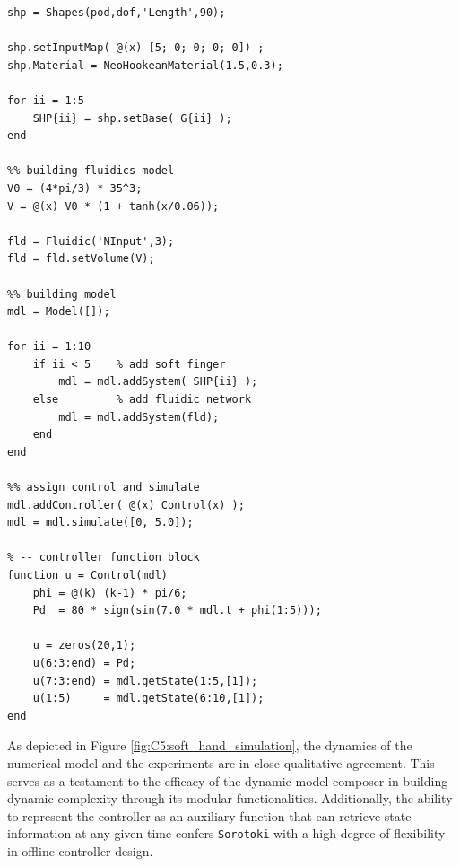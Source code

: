 \begin{lstlisting}[style=matlab]   
%% EXAMPLE: Model class
shp = Shapes(pod,dof,'Length',90);

shp.setInputMap( @(x) [5; 0; 0; 0; 0]) ;
shp.Material = NeoHookeanMaterial(1.5,0.3);

for ii = 1:5
    SHP{ii} = shp.setBase( G{ii} );
end
 
%% building fluidics model 
V0 = (4*pi/3) * 35^3;
V = @(x) V0 * (1 + tanh(x/0.06));

fld = Fluidic('NInput',3);
fld = fld.setVolume(V);

%% building model 
mdl = Model([]);

for ii = 1:10
    if ii < 5    % add soft finger
        mdl = mdl.addSystem( SHP{ii} );
    else         % add fluidic network
        mdl = mdl.addSystem(fld); 
    end
end

%% assign control and simulate
mdl.addController( @(x) Control(x) );
mdl = mdl.simulate([0, 5.0]);

% -- controller function block
function u = Control(mdl)
    phi = @(k) (k-1) * pi/6;
    Pd  = 80 * sign(sin(7.0 * mdl.t + phi(1:5)));

    u = zeros(20,1);
    u(6:3:end) = Pd;
    u(7:3:end) = mdl.getState(1:5,[1]);
    u(1:5)     = mdl.getState(6:10,[1]);
end
\end{lstlisting}

As depicted in Figure \ref{fig:C5:soft_hand_simulation}, the dynamics of the numerical model and the experiments are in close qualitative agreement. This serves as a testament to the efficacy of the dynamic model composer  in building dynamic complexity through its modular functionalities. Additionally, the ability to represent the controller as an auxiliary function that can retrieve state information at any given time confers \texttt{Sorotoki} with a high degree of flexibility in offline controller design.